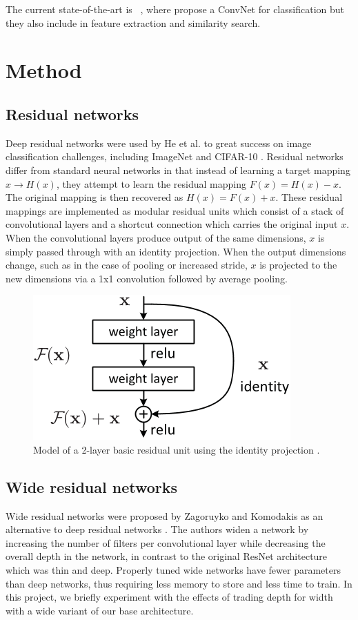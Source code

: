 \documentclass[10pt,twocolumn,letterpaper]{article}
\begin{document}
 The current state-of-the-art is ~\cite{seddati2016deepsketch}, where propose a ConvNet for classification but they also include in feature extraction and similarity search. 



\section{Method}
\subsection{Residual networks}
Deep residual networks were used by He et al. to great success on image classification challenges, including ImageNet and CIFAR-10 \cite{hekaming2016}. Residual networks differ from standard neural networks in that instead of learning a target mapping $x \rightarrow H(x)$, they attempt to learn the residual mapping $F(x) = H(x) - x$. The original mapping is then recovered as $H(x) = F(x) + x$. These residual mappings are implemented as modular residual units which consist of a stack of convolutional layers and a shortcut connection which carries the original input $x$. When the convolutional layers produce output of the same dimensions, $x$ is simply passed through with an identity projection. When the output dimensions change, such as in the case of pooling or increased stride, $x$ is projected to the new dimensions via a 1x1 convolution followed by average pooling.

 \begin{figure}[h]
	\begin{center}
	\includegraphics[width=.5\linewidth]{resnet}
	\caption{Model of a 2-layer basic residual unit using the identity projection \cite{hekaming2016}. }
	\end{center}
\end{figure}

\subsection{Wide residual networks}
Wide residual networks were proposed by Zagoruyko and Komodakis as an alternative to deep residual networks \cite{zagoruyko2016wide}. The authors widen a network by increasing the number of filters per convolutional layer while decreasing the overall depth in the network, in contrast to the original ResNet architecture which was thin and deep. Properly tuned wide networks have fewer parameters than deep networks, thus requiring less memory to store and less time to train. In this project, we briefly experiment with the effects of trading depth for width with a wide variant of our base architecture.
\end{document}
